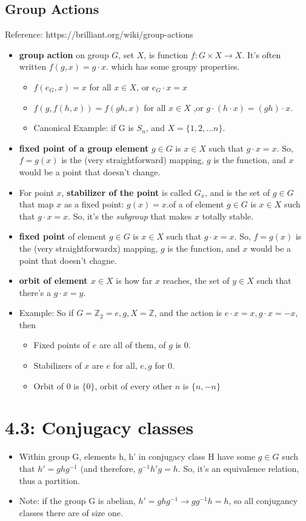 \documentclass[11pt, oneside]{article}   	%
\begin{document}
\subsection{Group Actions}
Reference: https://brilliant.org/wiki/group-actions
\begin{itemize}
\item \textbf{group action} on group $G$, set $X$, is function $f: G \times X \rightarrow X$.  It's often written $f(g,x) = g \cdot x$. which has some groupy properties.
  \begin{itemize}
  \item $f(e_G, x) = x$ for all $x \in X$, or $e_G \cdot x = x$
  \item $f(g, f(h, x)) = f(gh, x)$ for all $x \in X$ ,or $g \cdot (h \cdot x) = (gh) \cdot x$.
  \item Canonical Example: if G is $S_n$, and $X = \{1, 2, ... n\}$.  
  \end{itemize}

\item \textbf{fixed point of a group element} $g \in G$ is $x \in X$ such that $g \cdot x = x$.  So, $f = g(x)$ is the (very straightforward) mapping, $g$ is the function, and $x$ would be a point that doesn't change.
\item For point $x$, \textbf{stabilizer of the point} is called $G_x$, and is the set of $g \in G$ that map $x$ as a fixed point: $g(x) = x$.of a of element $g \in G$ is $x \in X$ such that $g \cdot x = x$.  So, it's the \emph{subgroup} that makes $x$ totally stable.
\item \textbf{fixed point} of element $g \in G$ is $x \in X$ such that $g \cdot x = x$.  So, $f = g(x)$ is the (very straightforwardx) mapping, $g$ is the function, and $x$ would be a point that doesn't chagne.
\item \textbf{orbit of element $x \in X$} is how far $x$ reaches, the set of $y \in X$ such that there's a $g \cdot x = y$.
\item Example: So if $G = \mathbb{Z}_2 = {e, g}, X = \mathbb{Z}$, and the action is $e \cdot x = x, g \cdot x = -x$, then
  \begin{itemize}
  \item Fixed points of $e$ are all of them, of $g$ is 0.
  \item Stabilizers of $x$ are $e$ for all, $e,g$ for 0.
  \item Orbit of 0 is $\{0\}$, orbit of every other $n$ is $\{n, -n\}$
  \end{itemize}
\end{itemize}


\section{4.3: Conjugacy classes}
\begin{itemize}
\item Within group G, elements h, h' in conjugacy class H have some $g \in G$ such that $h' = ghg^{-1}$ (and therefore,  $g^{-1}h'g = h$.  So, it's an equivalence relation, thus a partition.
\item Note: if the group G is abelian, $h' = ghg^{-1} \rightarrow gg^{-1} h = h$, so all conjugancy classes there are of size one.
\end{itemize}
\end{document}
